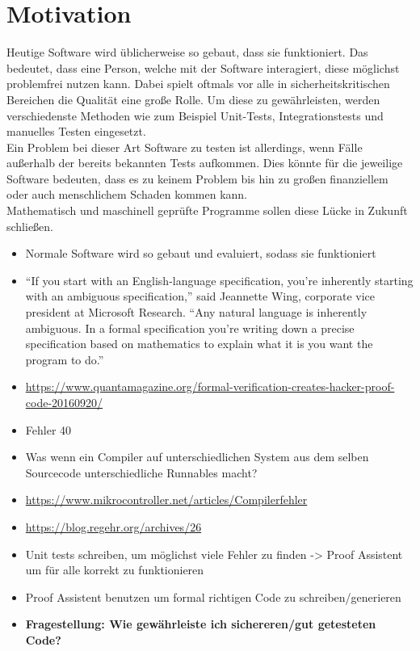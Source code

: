\section{Motivation}
Heutige Software wird üblicherweise so gebaut, dass sie funktioniert. Das bedeutet, dass eine Person, welche mit der Software interagiert, diese möglichst problemfrei nutzen kann. Dabei spielt oftmals vor alle in sicherheitskritischen Bereichen die Qualität eine große Rolle.
Um diese zu gewährleisten, werden verschiedenste Methoden wie zum Beispiel Unit-Tests, Integrationstests und manuelles Testen eingesetzt.\\
Ein Problem bei dieser Art Software zu testen ist allerdings, wenn Fälle außerhalb der bereits bekannten Tests aufkommen. Dies könnte für die jeweilige Software bedeuten, dass es zu keinem Problem bis hin zu großen finanziellem oder auch menschlichem Schaden kommen kann.\\
Mathematisch und maschinell geprüfte Programme sollen diese Lücke in Zukunft schließen.


\begin{itemize}
	\item Normale Software wird so gebaut und evaluiert, sodass sie funktioniert
	\item “If you start with an English-language specification, you’re inherently starting with an ambiguous specification,” said Jeannette Wing, corporate vice president at Microsoft Research. “Any natural language is inherently ambiguous. In a formal specification you’re writing down a precise specification based on mathematics to explain what it is you want the program to do.”
	\item \url{https://www.quantamagazine.org/formal-verification-creates-hacker-proof-code-20160920/}
	\item Fehler 40
	\item Was wenn ein Compiler auf unterschiedlichen System aus dem selben Sourcecode unterschiedliche Runnables macht?
	\item \url{https://www.mikrocontroller.net/articles/Compilerfehler}
	\item \url{https://blog.regehr.org/archives/26}
	\item Unit tests schreiben, um möglichst viele Fehler zu finden -> Proof Assistent um für alle korrekt zu funktionieren
	\item Proof Assistent benutzen um formal richtigen Code zu schreiben/generieren
	\item \textbf{Fragestellung: Wie gewährleiste ich sichereren/gut getesteten Code?}
\end{itemize}


